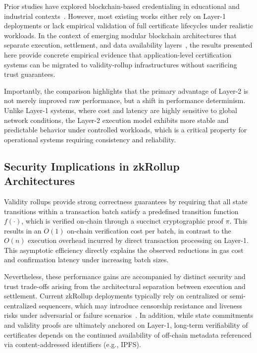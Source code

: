 \documentclass[pdflatex,sn-mathphys-num]{sn-jnl}
\begin{document}
Prior studies have explored blockchain-based credentialing in educational and industrial contexts~\cite{chen2023cert,arora2022sok}. However, most existing works either rely on Layer-1 deployments or lack empirical validation of full certificate lifecycles under realistic workloads. In the context of emerging modular blockchain architectures that separate execution, settlement, and data availability layers~\cite{malavolta2024modular}, the results presented here provide concrete empirical evidence that application-level certification systems can be migrated to validity-rollup infrastructures without sacrificing trust guarantees.

Importantly, the comparison highlights that the primary advantage of Layer-2 is not merely improved raw performance, but a shift in performance determinism. Unlike Layer-1 systems, where cost and latency are highly sensitive to global network conditions, the Layer-2 execution model exhibits more stable and predictable behavior under controlled workloads, which is a critical property for operational systems requiring consistency and reliability.


\subsection{Security Implications in zkRollup Architectures}

Validity rollups provide strong correctness guarantees by requiring that all state transitions within a transaction batch satisfy a predefined transition function $f(\cdot)$, which is verified on-chain through a succinct cryptographic proof $\pi$. This results in an $O(1)$ on-chain verification cost per batch, in contrast to the $O(n)$ execution overhead incurred by direct transaction processing on Layer-1. This asymptotic efficiency directly explains the observed reductions in gas cost and confirmation latency under increasing batch sizes.

Nevertheless, these performance gains are accompanied by distinct security and trust trade-offs arising from the architectural separation between execution and settlement. Current zkRollup deployments typically rely on centralized or semi-centralized sequencers, which may introduce censorship resistance and liveness risks under adversarial or failure scenarios~\cite{chaliasos2024snarkvulns}. In addition, while state commitments and validity proofs are ultimately anchored on Layer-1, long-term verifiability of certificates depends on the continued availability of off-chain metadata referenced via content-addressed identifiers (e.g., IPFS).
\end{document}
